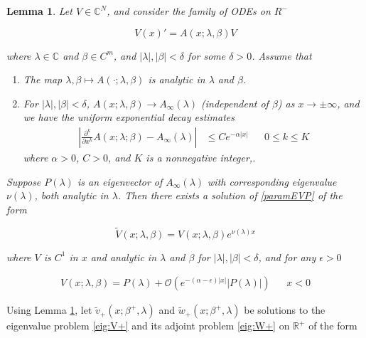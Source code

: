 \documentclass[12pt]{article}
\def\R{{\mathbb R}}
\def\C{{\mathbb C}}
\newtheorem{lemma}{Lemma}
\begin{document}
\begin{lemma}\label{gaplemma}
Let $V \in \C^N$, and consider the family of ODEs on $R^-$

\begin{equation}\label{paramEVP}
V(x)' = A(x; \lambda, \beta) V
\end{equation}

where $\lambda \in \C$ and $\beta \in C^m$, and $|\lambda|, |\beta| < \delta$ for some $\delta > 0$. Assume that

\begin{enumerate}
	\item The map $\lambda, \beta \mapsto A(\cdot; \lambda, \beta)$ is analytic in $\lambda$ and $\beta$.
	\item For $|\lambda|, |\beta| < \delta$, $A(x; \lambda, \beta) \rightarrow A_\infty(\lambda)$ (independent of $\beta$) as $x \rightarrow \pm \infty$, and we have the uniform exponential decay estimates 
	\begin{align}
	\left| \frac{\partial^k}{\partial x^k} A(x; \lambda; \beta) - A_\infty(\lambda) \right| 
	&\leq C e^{-\alpha |x|} && 0 \leq k \leq K
	\end{align}
	where $\alpha > 0$, $C > 0$, and $K$ is a nonnegative integer,.
\end{enumerate}

Suppose $P(\lambda)$ is an eigenvector of $A_\infty(\lambda)$ with corresponding eigenvalue $\nu(\lambda)$, both analytic in $\lambda$. Then there exists a solution of \ref{paramEVP} of the form 

\begin{equation}
\tilde{V}(x; \lambda, \beta) = V(x; \lambda, \beta) e^{\nu(\lambda)x}
\end{equation}

where $V$ is $C^1$ in $x$ and analytic in $\lambda$ and $\beta$ for $|\lambda|, |\beta| < \delta$, and for any $\epsilon > 0$

\begin{align}
V(x; \lambda, \beta) = P(\lambda) + \mathcal{O}(e^{-(\alpha - \epsilon)|x|}|P(\lambda)|) && x < 0
\end{align}

\end{lemma}
 
Using Lemma \ref{gaplemma}, let $\tilde{v}_+(x; \beta^+, \lambda)$ and $\tilde{w}_+(x; \beta^+, \lambda)$ be solutions to the eigenvalue problem \eqref{eig:V+} and its adjoint problem \eqref{eig:W+} on $\R^+$ of the form 
\end{document}
